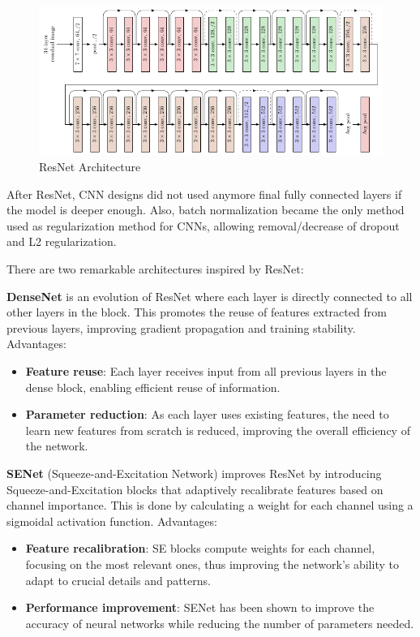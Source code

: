 \begin{figure}[!htbp]
    \centering
    \includegraphics[width=\textwidth]{tikz/chapter5 - ResNet.pdf}
    \caption{ResNet Architecture}
\end{figure}

After ResNet, CNN designs did not used anymore final fully connected layers if the model is deeper enough. Also, batch normalization became the only method used as regularization method for CNNs, allowing removal/decrease of dropout and L2 regularization.

There are two remarkable architectures inspired by ResNet: 

\textbf{DenseNet} is an evolution of ResNet where each layer is directly connected to all other layers in the block. This promotes the reuse of features extracted from previous layers, improving gradient propagation and training stability. Advantages:
\begin{itemize}
    \item \textbf{Feature reuse}: Each layer receives input from all previous layers in the dense block, enabling efficient reuse of information.
    \item \textbf{Parameter reduction}: As each layer uses existing features, the need to learn new features from scratch is reduced, improving the overall efficiency of the network.
\end{itemize}

\textbf{SENet} (Squeeze-and-Excitation Network) improves ResNet by introducing Squeeze-and-Excitation blocks that adaptively recalibrate features based on channel importance. This is done by calculating a weight for each channel using a sigmoidal activation function. Advantages:
\begin{itemize}
    \item \textbf{Feature recalibration}: SE blocks compute weights for each channel, focusing on the most relevant ones, thus improving the network's ability to adapt to crucial details and patterns.
    \item \textbf{Performance improvement}: SENet has been shown to improve the accuracy of neural networks while reducing the number of parameters needed.
\end{itemize}

